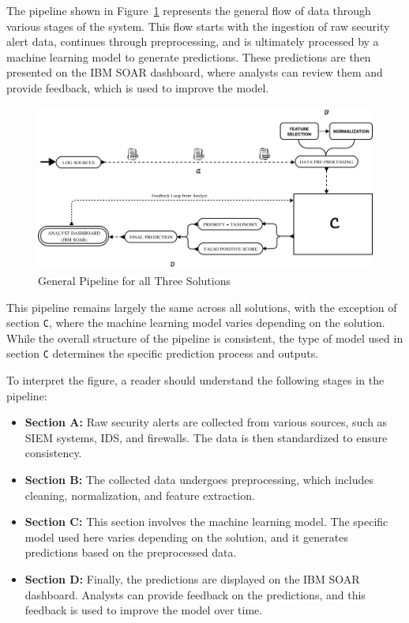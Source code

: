 The pipeline shown in Figure~\ref{fig:general_solution_pipeline} represents the general flow of data through various stages of the system. 
This flow starts with the ingestion of raw security alert data, continues through preprocessing, and is ultimately processed by a machine learning model to generate predictions. 
These predictions are then presented on the IBM SOAR dashboard, where analysts can review them and provide feedback, which is used to improve the model. 

\begin{figure}[h!]
    \centering
    \includegraphics[width=\textwidth]{ch3/assets/general_solution_pipeline.png}
    \caption{General Pipeline for all Three Solutions}
    \label{fig:general_solution_pipeline}
\end{figure}

This pipeline remains largely the same across all solutions, with the exception of section \texttt{C}, where the machine learning model varies depending on the solution. 
While the overall structure of the pipeline is consistent, the type of model used in section \texttt{C} determines the specific prediction process and outputs.

To interpret the figure, a reader should understand the following stages in the pipeline:
\begin{itemize}
    \item \textbf{Section A:} Raw security alerts are collected from various sources, such as SIEM systems, IDS, and firewalls. The data is then standardized to ensure consistency.
    \item \textbf{Section B:} The collected data undergoes preprocessing, which includes cleaning, normalization, and feature extraction.
    \item \textbf{Section C:} This section involves the machine learning model. The specific model used here varies depending on the solution, and it generates predictions based on the preprocessed data.
    \item \textbf{Section D:} Finally, the predictions are displayed on the IBM SOAR dashboard. Analysts can provide feedback on the predictions, and this feedback is used to improve the model over time.
\end{itemize}

